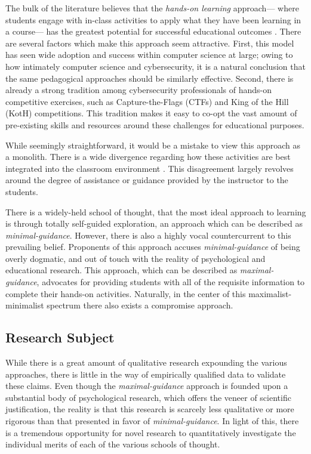 \documentclass{article}
\begin{document}
    The bulk of the literature believes that the \emph{hands-on learning} approach---%
where students engage with in-class activities to apply what they have been learning in a course---%
has the greatest potential for successful educational outcomes \cite{K-Leune, Z-Zeng, Y-Deng, W-Du, N-Eliot}. %
There are several factors which make this approach seem attractive. %
First, this model has seen wide adoption and success within computer science at large; %
owing to how intimately computer science and cybersecurity, it is a natural conclusion that the same pedagogical approaches should be similarly effective. %
Second, there is already a strong tradition among cybersecurity professionals of hands-on competitive exercises, such as Capture-the-Flags (CTFs) and King of the Hill (KotH) competitions. %
This tradition makes it easy to co-opt the vast amount of pre-existing skills and resources around these challenges for educational purposes. 

    While seemingly straightforward, it would be a mistake to view this approach as a monolith. %
There is a wide divergence regarding how these activities are best integrated into the classroom environment \cite{J-Sweller, L-Thomas, R-Weiss}. %
This disagreement largely revolves around the degree of assistance or guidance provided by the instructor to the students. 

    There is a widely-held school of thought, that the most ideal approach to learning is through totally self-guided exploration, an approach which can be described as \emph{minimal-guidance}. %
However, there is also a highly vocal countercurrent to this prevailing belief. %
Proponents of this approach accuses \emph{minimal-guidance} of being overly dogmatic, and out of touch with the reality of psychological and educational research. %
This approach, which can be described as \emph{maximal-guidance}, advocates for providing students with all of the requisite information to complete their hands-on activities. %
Naturally, in the center of this maximalist-minimalist spectrum there also exists a compromise approach.

    \subsection{Research Subject} 
        While there is a great amount of qualitative research expounding the various approaches, there is little in the way of empirically qualified data to validate these claims. %
Even though the \emph{maximal-guidance} approach is founded upon a substantial body of psychological research, which offers the veneer of scientific justification, the reality is that this research is scarcely less qualitative or more rigorous than that presented in favor of \emph{minimal-guidance}. %
In light of this, there is a tremendous opportunity for novel research to quantitatively investigate the individual merits of each of the various schools of thought.
\end{document}
